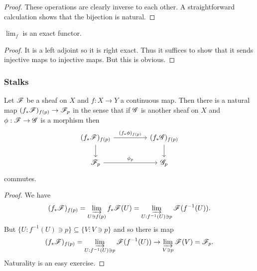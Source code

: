 \documentclass{memoir}
\begin{document}
\begin{proof}
    These operations are clearly inverse to each other.
    A straightforward calculation shows that the bijection is natural.
\end{proof}
\begin{corollary}
    $\lim_f$ is an exact functor.
\end{corollary}
\begin{proof}
    It is a left adjoint so it is right exact. 
    Thus it suffices to show that it sends injective maps to injective maps. But this is obvious.
\end{proof}
\subsubsection{Stalks}
\begin{proposition}
    Let $\mathscr{F}$ be a sheaf on $X$ and $f:X\to Y$ a continuous map.
    Then there is a natural map $(f_*\mathscr{F})_{f(p)} \to \mathscr{F}_p$ in the sense that if $\mathscr{G}$ is another sheaf on $X$ and $\phi:\mathscr{F}\to \mathscr{G}$ is a morphism then
    \begin{equation}
        \begin{tikzcd}[column sep = huge]
            (f_*\shf{F})_{f(p)} \arrow[r,"(f_*\phi)_{f(p)}"] \arrow[d] & (f_*\shf{G})_{f(p)} \arrow[d] \\
            \shf{F}_p \arrow[r,"\phi_p"] & \shf{G}_p
        \end{tikzcd}
    \end{equation}
    commutes.
\end{proposition}
\begin{proof}
    We have
    \begin{equation}
        (f_*\mathscr{F})_{f(p)} = \varinjlim_{U\ni f(p)} f_*\mathscr{F}(U) = \varinjlim_{U:f^{-1}(U)\ni p}\mathscr{F}(f^{-1}(U)).
    \end{equation}
    But $\{U:f^{-1}(U)\ni p\}\subseteq \{V:V\ni p\}$ and so there is map 
    \begin{equation}
        (f_*\mathscr{F})_{f(p)} = \varinjlim_{U:f^{-1}(U)\ni p}\mathscr{F}(f^{-1}(U)) \to \varinjlim_{V\ni p}\mathscr{F}(V) = \mathscr{F}_p.
    \end{equation}
    Naturality is an easy exercise.
\end{proof}
\end{document}
